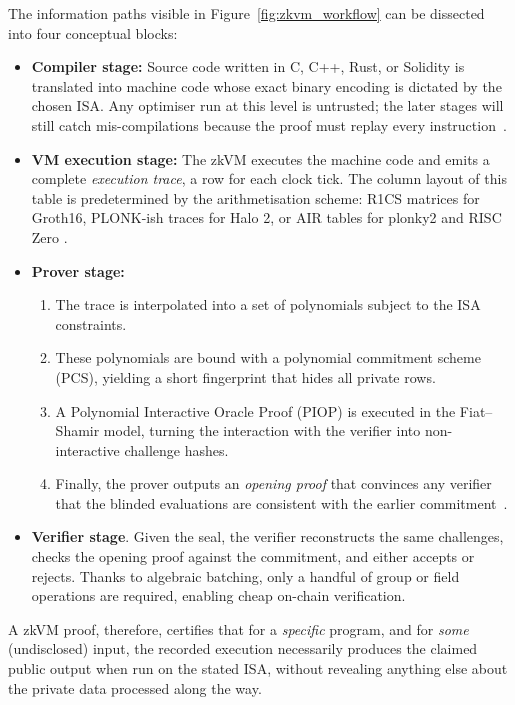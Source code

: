 The information paths visible in Figure~\ref{fig:zkvm_workflow} can be dissected into four conceptual blocks:
\begin{itemize}
  \item \textbf{Compiler stage:} Source code written in C, C++, Rust, or Solidity is translated into machine code whose exact binary encoding is dictated by the chosen ISA.  Any optimiser run at this level is untrusted; the later stages will still catch mis-compilations because the proof must replay every instruction~\cite{turn0search9}.
  \item \textbf{VM execution stage:}  The zkVM executes the machine code and emits a complete \textit{execution trace}, a row for each clock tick.  The column layout of this table is predetermined by the arithmetisation scheme: R1CS matrices for Groth16, PLONK-ish traces for Halo 2, or AIR tables for plonky2 and RISC Zero \cite{turn0search11}.
  \item \textbf{Prover stage:}
  \begin{enumerate} [label=\textit{(\roman*)}]
      \item The trace is interpolated into a set of polynomials subject to the ISA constraints. 
      \item These polynomials are bound with a polynomial commitment scheme (PCS), yielding a short fingerprint that hides all private rows.
      \item A Polynomial Interactive Oracle Proof (PIOP) is executed in the Fiat–Shamir model, turning the interaction with the verifier into non-interactive challenge hashes. 
      \item Finally, the prover outputs an \textit{opening proof} that convinces any verifier that the blinded evaluations are consistent with the earlier commitment~\cite{turn0search10}.
  \end{enumerate}
  
  \item \textbf{Verifier stage}.  Given the seal, the verifier reconstructs the same challenges, checks the opening proof against the commitment, and either accepts or rejects. Thanks to algebraic batching, only a handful of group or field operations are required, enabling cheap on-chain verification.  
\end{itemize}

A zkVM proof, therefore, certifies that for a \textit{specific} program, and for \textit{some} (undisclosed) input, the recorded execution necessarily produces the claimed public output when run on the stated ISA, without revealing anything else about the private data processed along the way.


